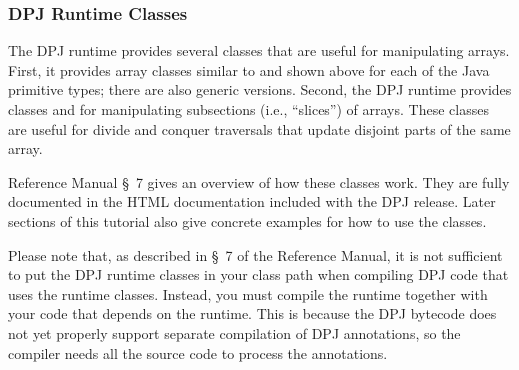 \subsubsection{DPJ Runtime Classes}

The DPJ runtime provides several classes that are useful for
manipulating arrays.  First, it provides array classes similar to
 and  shown above for each of the Java
primitive types; there are also generic versions.  Second, the DPJ
runtime provides classes  and  for
manipulating subsections (i.e., ``slices'') of arrays.  These classes
are useful for divide and conquer traversals that update disjoint
parts of the same array.  

Reference Manual \S~7 gives an overview of how these classes work.
They are fully documented in the HTML documentation included with the
DPJ release.  Later sections of this tutorial also give concrete
examples for how to use the classes.

Please note that, as described in \S~7 of the Reference Manual, it is
not sufficient to put the DPJ runtime classes in your class path when
compiling DPJ code that uses the runtime classes.  Instead, you must
compile the runtime together with your code that depends on the
runtime.  This is because the DPJ bytecode does not yet properly
support separate compilation of DPJ annotations, so the compiler needs
all the source code to process the annotations.
%

